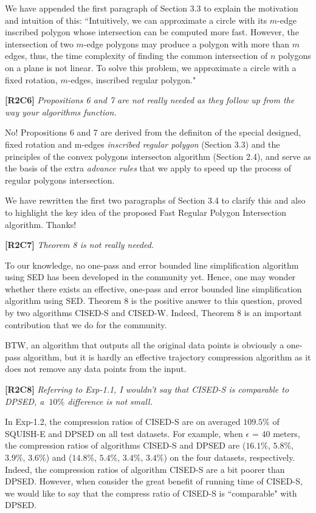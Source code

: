 \documentclass{letter}
\begin{document}
We have appended the first paragraph of Section 3.3 to explain the motivation and intuition of this: ``Intuitively, we can approximate a circle with its $m$-edge inscribed polygon {whose intersection can be computed more fast}. However, the intersection of two $m$-edge polygons may produce a polygon with more than $m$ edges, thus, the time complexity of finding the common intersection of $n$ polygons on a plane is not linear. To solve this problem, we approximate a circle with a fixed rotation, $m$-edges, inscribed regular polygon."



\textbf{[R2C6]} \emph{Propositions 6 and 7 are not really needed as they follow up from the way your algorithms function.}

No! Propositions 6 and 7 are derived from the definiton of the special designed, fixed rotation and m-edges \emph{inscribed regular polygon} (Section 3.3) and the principles of the convex polygons intersecton algorithm (Section 2.4), and serve as the basis of the extra \emph{advance rules} that we apply to speed up the process of regular polygons intersection.

We have rewritten the first two paragraphs of Section 3.4 to clarify this and also to highlight the key idea of the proposed Fast Regular Polygon Intersection algorithm. Thanks!

\textbf{[R2C7]} \emph{Theorem 8 is not really needed.}

To our knowledge, no one-pass and error bounded line simplification algorithm using SED has been developed in the community yet. Hence, one may wonder whether there exists an effective, one-pass and error bounded line simplification algorithm using SED. Theorem 8 is the positive answer to this question, proved by two algorithms CISED-S and CISED-W. Indeed, Theorem 8 is an important contribution that we do for the community. 

BTW, an algorithm that outputs all the original data points is obviously a one-pass algorithm, but it is hardly an effective trajectory compression algorithm as it does not remove any data points from the input.

\textbf{[R2C8]} \emph{Referring to Exp-1.1, I wouldn't say that CISED-S is comparable to DPSED, a $~10\%$ difference is not small.}

In Exp-1.2, the compression ratios of CISED-S are on averaged $109.5\%$ of SQUISH-E and DPSED on all test datasets. For example, when $\epsilon$ = $40$ meters, the compression ratios of algorithms CISED-S and DPSED are ($16.1\%$, $5.8\%$, $3.9\%$, $3.6\%$) and ($14.8\%$, $5.4\%$, $3.4\%$, $3.4\%$) on the four datasets, respectively. Indeed, the compression ratios of algorithm CISED-S are a bit poorer than DPSED. However, when consider the great benefit of running time of CISED-S, we would like to say that the compress ratio of CISED-S is ``comparable" with DPSED. 
\end{document}
